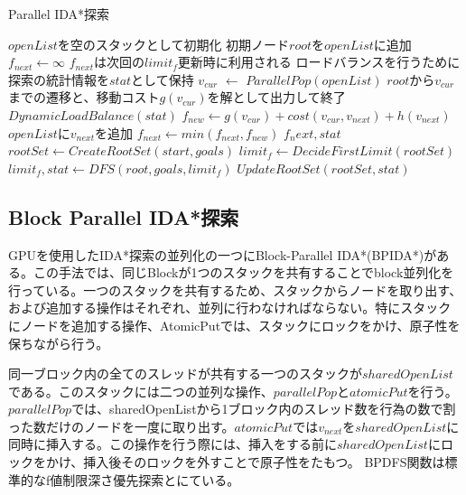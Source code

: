 \documentclass[a4paper,11pt,oneside,openany]{jsbook}
\begin{document}
\newpage
\begin{algorithm}
\caption{Parallel IDA*探索}
\label{alg:pbnf}
\begin{algorithmic}[1]
    \State $openList$を空のスタックとして初期化
    \State 初期ノード$root$を$openList$に追加
    \State $f_{next} \leftarrow \infty$
    \State $f_{next}$は次回の$limit_f$更新時に利用される
    \State ロードバランスを行うために探索の統計情報を$stat$として保持
        \State $v_{cur}$ $\leftarrow$ ${ParallelPop}(openList)$
            \State $root$から$v_{cur}$までの遷移と、移動コスト$g(v_{cur})$を解として出力して終了
        \EndIf
            \State $DynamicLoadBalance(stat)$
        \EndIf
            \State $f_{new} \leftarrow g(v_{cur}) + cost(v_{cur}, v_{next}) + h(v_{next})$
                \State $openList$に$v_{next}$を追加
            \Else
                \State $f_{next} \leftarrow min(f_{next}, f_{new})$
            \EndIf
        \EndFor
    \EndWhile
    \State \Return $f_next, stat$
\EndFunction
{}
    \State $rootSet \gets {CreateRootSet}(start, goals)$
    \State $limit_f \leftarrow {DecideFirstLimit}(rootSet)$
            \State $limit_f, stat \gets {DFS}(root, goals, limit_f)$
        \EndParallelForByThreads
        \State $UpdateRootSet(rootSet, stat)$
    \EndWhile
\EndFunction

\end{algorithmic}
\end{algorithm}
\newpage


\subsection{Block Parallel IDA*探索}
GPUを使用したIDA*探索の並列化の一つにBlock-Parallel IDA*(BPIDA*)\cite{HA17}がある。この手法では、同じBlockが1つのスタックを共有することでblock並列化を行っている。一つのスタックを共有するため、スタックからノードを取り出す、および追加する操作はそれぞれ、並列に行わなければならない。特にスタックにノードを追加する操作、AtomicPutでは、スタックにロックをかけ、原子性を保ちながら行う。

同一ブロック内の全てのスレッドが共有する一つのスタックが$sharedOpenList$である。このスタックには二つの並列な操作、$parallelPop$と$atomicPut$を行う。$parallelPop$では、sharedOpenListから1ブロック内のスレッド数を行為の数で割った数だけのノードを一度に取り出す。$atomicPut$では$v_{next}$を$sharedOpenList$に同時に挿入する。この操作を行う際には、挿入をする前に$sharedOpenList$にロックをかけ、挿入後そのロックを外すことで原子性をたもつ。
BPDFS関数は標準的なf値制限深さ優先探索とにている。
\end{document}
